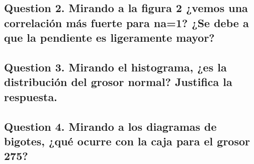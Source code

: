 \documentclass[]{article}
\begin{document}
\hypertarget{question-2}{%
	\subsection{Question 2. Mirando a la figura 2 ¿vemos una correlación más fuerte para na=1? ¿Se debe a que la pendiente es ligeramente mayor?}\label{question-2}}

\hypertarget{question-3}{%
	\subsection{Question 3. Mirando el histograma, ¿es la distribución del grosor normal? Justifica la respuesta.}\label{question-3}}

\hypertarget{question-4}{%
	\subsection{Question 4. Mirando a los diagramas de bigotes, ¿qué ocurre con la caja para el grosor 275?}\label{question-4}}
\end{document}
